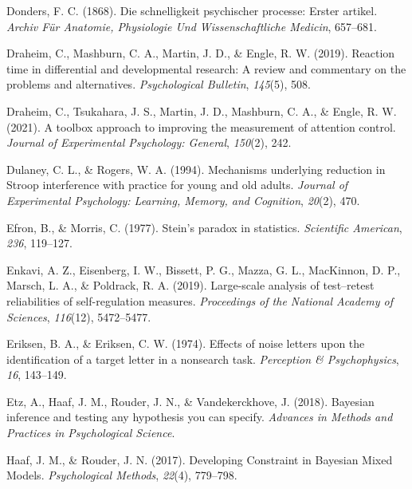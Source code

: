 \documentclass[
  ,man]{apa6}
\newlength{\cslhangindent}
\newlength{\cslentryspacingunit} %
\newenvironment{CSLReferences}[2] %
 {%
  \setlength{\parindent}{0pt}
  \ifodd #1
  \let\oldpar\par
  \def\par{\hangindent=\cslhangindent\oldpar}
  \fi
  \setlength{\parskip}{#2\cslentryspacingunit}
 }%
 {}
\begin{document}
\begin{CSLReferences}{1}{0}
\leavevmode{}%
Donders, F. C. (1868). Die schnelligkeit psychischer processe: {Erster} artikel. \emph{Archiv Für Anatomie, Physiologie Und Wissenschaftliche Medicin}, 657--681.

\leavevmode{}%
Draheim, C., Mashburn, C. A., Martin, J. D., \& Engle, R. W. (2019). Reaction time in differential and developmental research: {A} review and commentary on the problems and alternatives. \emph{Psychological Bulletin}, \emph{145}(5), 508.

\leavevmode{}%
Draheim, C., Tsukahara, J. S., Martin, J. D., Mashburn, C. A., \& Engle, R. W. (2021). A toolbox approach to improving the measurement of attention control. \emph{Journal of Experimental Psychology: General}, \emph{150}(2), 242.

\leavevmode{}%
Dulaney, C. L., \& Rogers, W. A. (1994). Mechanisms underlying reduction in {Stroop} interference with practice for young and old adults. \emph{Journal of Experimental Psychology: Learning, Memory, and Cognition}, \emph{20}(2), 470.

\leavevmode{}%
Efron, B., \& Morris, C. (1977). Stein's paradox in statistics. \emph{Scientific American}, \emph{236}, 119--127.

\leavevmode{}%
Enkavi, A. Z., Eisenberg, I. W., Bissett, P. G., Mazza, G. L., MacKinnon, D. P., Marsch, L. A., \& Poldrack, R. A. (2019). Large-scale analysis of test--retest reliabilities of self-regulation measures. \emph{Proceedings of the National Academy of Sciences}, \emph{116}(12), 5472--5477.

\leavevmode{}%
Eriksen, B. A., \& Eriksen, C. W. (1974). Effects of noise letters upon the identification of a target letter in a nonsearch task. \emph{Perception \& Psychophysics}, \emph{16}, 143--149.

\leavevmode{}%
Etz, A., Haaf, J. M., Rouder, J. N., \& Vandekerckhove, J. (2018). Bayesian inference and testing any hypothesis you can specify. \emph{Advances in Methods and Practices in Psychological Science}.

\leavevmode{}%
Haaf, J. M., \& Rouder, J. N. (2017). Developing {Constraint} in {Bayesian Mixed Models}. \emph{Psychological Methods}, \emph{22}(4), 779--798.


\end{CSLReferences}
\end{document}
